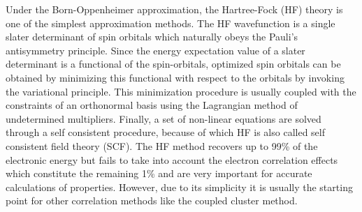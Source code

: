 Under the Born-Oppenheimer approximation\cite{Born27}, the Hartree-Fock (HF) theory\cite{SzaboOstlund} is one of the simplest
approximation methods. The HF wavefunction is a single slater determinant of spin orbitals which
naturally obeys the Pauli's antisymmetry principle.
Since the energy expectation value of a slater determinant is a functional of
the spin-orbitals, optimized spin orbitals can be obtained by minimizing this
functional with respect to the orbitals by invoking the variational principle.
This minimization procedure is usually coupled with the constraints of an
orthonormal basis using the Lagrangian method of undetermined multipliers.
Finally, a set of non-linear equations are solved through a self consistent
procedure, because of which HF is also called self consistent field theory
(SCF). The HF method recovers up to 99\% of the electronic energy but fails to take
into account the electron correlation effects which constitute the remaining
1\% and are very important for accurate calculations of properties. 
However, due to its simplicity it is usually the starting point for other
correlation methods like the coupled cluster method. \\\\
